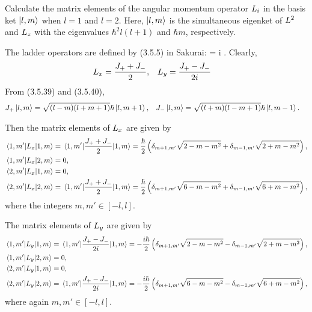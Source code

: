 \begin{problem}
	Calculate the matrix elements of the angular momentum operator $L_i$ in the basis ket $\ket{l, m}$ when $l = 1$ and $l = 2$.  Here, $\ket{l, m}$ is the simultaneous eigenket of $L^2$ and $L_z$ with the eigenvalues $\hbar^2 l (l + 1)$ and $\hbar m$, respectively.
\end{problem}

\begin{solution}
	The ladder operators are defined by (3.5.5) in Sakurai:
	\beq
		\Jpm = \Lx \pm i \Ly.
	\eeq
	Clearly,
	\begin{align*}
		L_x &= \frac{J_+ + J_-}{2}, &
		L_y &= \frac{J_+ - J_-}{2 i}
	\end{align*}
	From (3.5.39) and (3.5.40),
	\begin{align*}
		J_+ \ket{l, m} &= \sqrt{(l - m)(l + m + 1)} \hbar \ket{l, m+1}, &
		J_- \ket{l, m} &= \sqrt{(l + m)(l - m + 1)} \hbar \ket{l, m-1}.
	\end{align*}
	
	Then the matrix elements of $L_x$ are given by
	\begin{align*}
		\mel*{1, m'}{L_x}{1, m} &= \mel*{1, m'}{\frac{J_+ + J_-}{2}}{1, m} = \frac{\hbar}{2} \left( \delta_{m+1, m'} \sqrt{2 - m - m^2} + \delta_{m-1, m'} \sqrt{2 + m - m^2} \right), \\
		\mel*{1, m'}{L_x}{2, m} &= 0, \\
		\mel*{2, m'}{L_x}{1, m} &= 0, \\
		\mel*{2, m'}{L_x}{2, m} &= \mel*{1, m'}{\frac{J_+ + J_-}{2}}{1, m} = \frac{\hbar}{2} \left( \delta_{m+1, m'} \sqrt{6 - m - m^2} + \delta_{m-1, m'} \sqrt{6 + m - m^2} \right),
	\end{align*}
	where the integers $m, m' \in [-l, l]$.
	
	The matrix elements of $L_y$ are given by
	\begin{align*}
		\mel*{1, m'}{L_y}{1, m} &= \mel*{1, m'}{\frac{J_+ - J_-}{2 i}}{1, m} = -\frac{i\hbar}{2} \left( \delta_{m+1, m'} \sqrt{2 - m - m^2} - \delta_{m-1, m'} \sqrt{2 + m - m^2} \right), \\
		\mel*{1, m'}{L_y}{2, m} &= 0, \\
		\mel*{2, m'}{L_y}{1, m} &= 0, \\
		\mel*{2, m'}{L_y}{2, m} &= \mel*{1, m'}{\frac{J_+ - J_-}{2 i}}{1, m} = -\frac{i\hbar}{2} \left( \delta_{m+1, m'} \sqrt{6 -m - m^2} - \delta_{m-1, m'} \sqrt{6 + m - m^2} \right),
	\end{align*}
	where again $m, m' \in [-l, l]$.
		

\end{solution}
